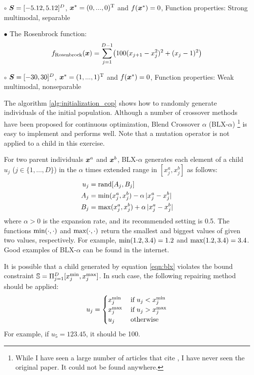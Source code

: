 \documentclass[11pt]{article}
\def\vector#1{\mbox{\boldmath $#1$}}
\def\vector#1{\mbox{\boldmath $#1$}}
\begin{document}
$\circ$ $\vector{S} = [-5.12, 5.12]^D$, $\vector{x}^* = (0, ..., 0)^{\rm T}$ and $f(\vector{x}^*) = 0$, Function properties: Strong multimodal, separable

\noindent $\bullet$ The Rosenbrock function:
%
\begin{align}
\label{eqn:rosenbrock}
f_{\rm Rosenbrock}(\vector{x}) = \sum^{D-1}_{j = 1} \bigl(100(x_{j + 1} - x^2_j)^2 + (x_j - 1)^2\bigr)
\end{align}
%

$\circ$ $\vector{S} = [-30, 30]^D$,  $\vector{x}^* = (1, ..., 1)^{\rm T}$ and $f(\vector{x}^*) = 0$,  Function properties: Weak multimodal, nonseparable






The algorithm \ref{alg:initialization_cop} shows how to randomly generate individuals of the initial population.
Although a number of crossover methods have been proposed for continuous optimization, Blend Crossover $\alpha$ (BLX-$\alpha$) \cite{EshelmanS92}\footnote{While I have seen a large number of articles that cite \cite{EshelmanS92}, I have never seen the original paper. It could not be found anywhere.} is easy to implement and performs well. Note that a mutation operator is not applied to a child in this exercise.

For two parent individuals $\vector{x}^{a}$ and $\vector{x}^{b}$, BLX-$\alpha$ generates each element of a child $u_j$ ($j \in \{1, ..., D\}$) in the $\alpha$ times extended range in $[x_{j}^{a}, x_{j}^{b}]$ as follows:
%
\begin{align}
\label{eqn:blx}
u_{j} &= {\rm rand}[A_j, B_j]\\
A_{j} &= {\rm min}(x_{j}^{a}, x_{j}^{b}) - \alpha \, |x_{j}^{a} - x_{j}^{b}| \\
B_{j} &= {\rm max}(x_{j}^{a}, x_{j}^{b}) + \alpha \, |x_{j}^{a} - x_{j}^{b}|
\end{align}
%
where $\alpha > 0$ is the expansion rate, and its recommended setting is 0.5. The functions ${\rm min(\cdot, \cdot)}$ and ${\rm max(\cdot, \cdot)}$ return the smallest and biggest values of given two values, respectively.
For example, ${\rm min(1.2, 3.4)} = 1.2$ and ${\rm max(1.2, 3.4)} = 3.4$.
Good examples of BLX-$\alpha$ can be found in the internet.

It is possible that a child generated by equation \eqref{eqn:blx} violates the bound constraint $\mathbb{S} = \Pi^D_{j=1} [x^{\rm min}_j, x^{\rm max}_j]$.
In such case, the following repairing method should be applied:
%
\begin{align}
\label{eqn:replacing}
  u_j = \begin{cases}
    x^{\rm min}_j & \:  {\rm if} \: u_j < x^{\rm min}_j \\
    x^{\rm max}_j & \:  {\rm if} \: u_j > x^{\rm max}_j \\
    u_j & \:  {\rm otherwise}
  \end{cases}
\end{align}
%
For example, if $u_5 = 123.45$, it should be 100. 
\end{document}
